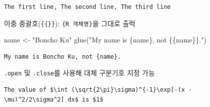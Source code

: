 \documentclass[
  11pt,
]{krantz}
\newenvironment{Shaded}{\begin{snugshade}}{\end{snugshade}}
\newcommand{\AttributeTok}[1]{\textcolor[rgb]{0.61,0.61,0.61}{#1}}
\newcommand{\DecValTok}[1]{\textcolor[rgb]{0.06,0.06,0.06}{#1}}
\newcommand{\FunctionTok}[1]{\textcolor[rgb]{0,0,0}{#1}}
\newcommand{\NormalTok}[1]{#1}
\newcommand{\OtherTok}[1]{\textcolor[rgb]{0.37,0.37,0.37}{#1}}
\newcommand{\SpecialCharTok}[1]{\textcolor[rgb]{0,0,0}{#1}}
\newcommand{\StringTok}[1]{\textcolor[rgb]{0.5,0.5,0.5}{#1}}
\begin{document}
\begin{verbatim}
The first line, The second line, The third line
\end{verbatim}

\normalsize

이중 중괄호(\texttt{\{\{\}\}}): \texttt{\{R\ 객체명\}}을 그대로 출럭

\footnotesize

\begin{Shaded}
\begin{Highlighting}[]
\NormalTok{name }\OtherTok{\textless{}{-}} \StringTok{"Boncho Ku"}
\FunctionTok{glue}\NormalTok{(}\StringTok{"My name is \{name\}, not \{\{name\}\}."}\NormalTok{)}
\end{Highlighting}
\end{Shaded}

\begin{verbatim}
My name is Boncho Ku, not {name}.
\end{verbatim}

\normalsize

\texttt{.open} 및 \texttt{.close}를 사용해 대체 구분기호 지정 가능

\footnotesize

\begin{Shaded}
\end{Shaded}

\begin{verbatim}
The value of $\int (\sqrt{2\pi}\sigma)^{-1}\exp[-(x - \mu)^2/2\sigma^2] dx$ is $1$
\end{verbatim}
\end{document}
